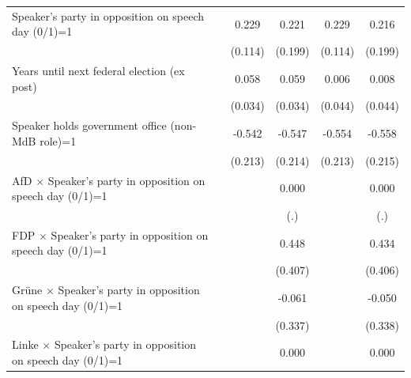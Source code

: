 \begin{table}[htbp]
\begin{tabular}{l*{5}{c}}
\addlinespace
Speaker's party in opposition on speech day (0/1)=1&                     &       0.229\sym{**} &       0.221         &       0.229\sym{**} &       0.216         \\
                    &                     &     (0.114)         &     (0.199)         &     (0.114)         &     (0.199)         \\
\addlinespace
Years until next federal election (ex post)&                     &       0.058\sym{*}  &       0.059\sym{*}  &       0.006         &       0.008         \\
                    &                     &     (0.034)         &     (0.034)         &     (0.044)         &     (0.044)         \\
\addlinespace
Speaker holds government office (non-MdB role)=1&                     &      -0.542\sym{**} &      -0.547\sym{**} &      -0.554\sym{***}&      -0.558\sym{***}\\
                    &                     &     (0.213)         &     (0.214)         &     (0.213)         &     (0.215)         \\
\addlinespace
AfD $\times$ Speaker's party in opposition on speech day (0/1)=1&                     &                     &       0.000         &                     &       0.000         \\
                    &                     &                     &         (.)         &                     &         (.)         \\
\addlinespace
FDP $\times$ Speaker's party in opposition on speech day (0/1)=1&                     &                     &       0.448         &                     &       0.434         \\
                    &                     &                     &     (0.407)         &                     &     (0.406)         \\
\addlinespace
Grüne $\times$ Speaker's party in opposition on speech day (0/1)=1&                     &                     &      -0.061         &                     &      -0.050         \\
                    &                     &                     &     (0.337)         &                     &     (0.338)         \\
\addlinespace
Linke $\times$ Speaker's party in opposition on speech day (0/1)=1&                     &                     &       0.000         &                     &       0.000         \\

\end{tabular}
\end{table}

